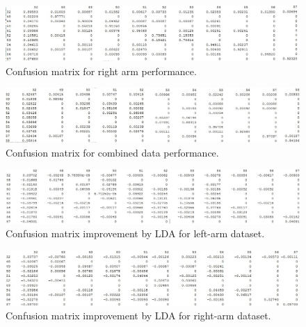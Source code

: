 \documentclass{sig-alternate}
\begin{document}
\begin{figure}[bp]
\begin{center}
  \includegraphics[width=1.0\linewidth]{visual_results/nConfkNN_right.jpg}
\end{center}
  \caption{Confusion matrix for right arm performance.}
  \label{fig:conf_right}
\end{figure}

\begin{figure}[bp]
\begin{center}
  \includegraphics[width=1.0\linewidth]{visual_results/nConfkNN_both.jpg}
\end{center}
  \caption{Confusion matrix for combined data performance.}
  \label{fig:conf_both}
\end{figure}

\begin{figure}
\begin{center}
  \includegraphics[width=1.0\linewidth]{visual_results/nConfkNN_left_imp_LDA.jpg}
\end{center}
  \caption{Confusion matrix improvement by LDA for left-arm dataset.}
  \label{fig:conf_left_imp_LDA}
\end{figure}

\begin{figure}
\begin{center}
  \includegraphics[width=1.0\linewidth]{visual_results/nConfkNN_right_imp_LDA.jpg}
\end{center}
  \caption{Confusion matrix improvement by LDA for right-arm dataset.}
  \label{fig:conf_right_imp_LDA}
\end{figure}
\end{document}
